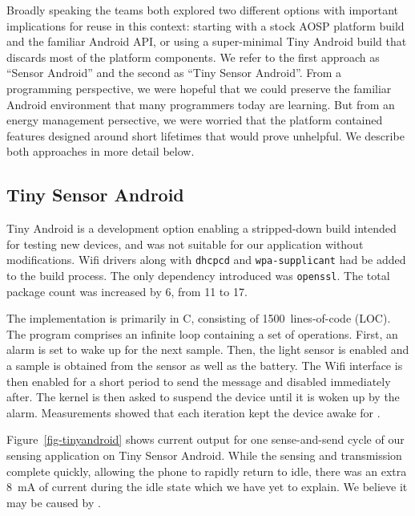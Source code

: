 Broadly speaking the teams both explored two different options with important
implications for reuse in this context: starting with a stock AOSP platform
build and the familiar Android API, or using a super-minimal Tiny Android
build that discards most of the platform components. We refer to the first
approach as ``Sensor Android'' and the second as ``Tiny Sensor Android''.
From a programming perspective, we were hopeful that we could preserve the
familiar Android environment that many programmers today are learning. But
from an energy management persective, we were worried that the platform
contained features designed around short lifetimes that would prove
unhelpful. We describe both approaches in more detail below.

\subsection{Tiny Sensor Android}
\label{subsec-tiny}

Tiny Android is a development option enabling a stripped-down build intended
for testing new devices, and was not suitable for our application without
modifications. Wifi drivers along with \texttt{dhcpcd} and
\texttt{wpa-supplicant} had be added to the build process. The only
dependency introduced was \texttt{openssl}. The total package count was
increased by 6, from 11 to 17.

The implementation is primarily in C, consisting of 1500~lines-of-code
(LOC). The program comprises an infinite loop containing a set of operations. 
First, an alarm is set to wake up for the next sample. Then, the light
sensor is enabled and a sample is obtained from the sensor as well as the
battery. The Wifi interface is then enabled for a short period to send the
message and disabled immediately after. The kernel is then asked to suspend the
device until it is woken up by the alarm.
Measurements showed that each iteration kept the device awake for .

Figure~\ref{fig-tinyandroid} shows current output for one sense-and-send
cycle of our sensing application on Tiny Sensor Android. While the sensing
and transmission complete quickly, allowing the phone to rapidly return to
idle, there was an extra 8~mA of current during the idle state which we have
yet to explain. We believe it may be caused by .

